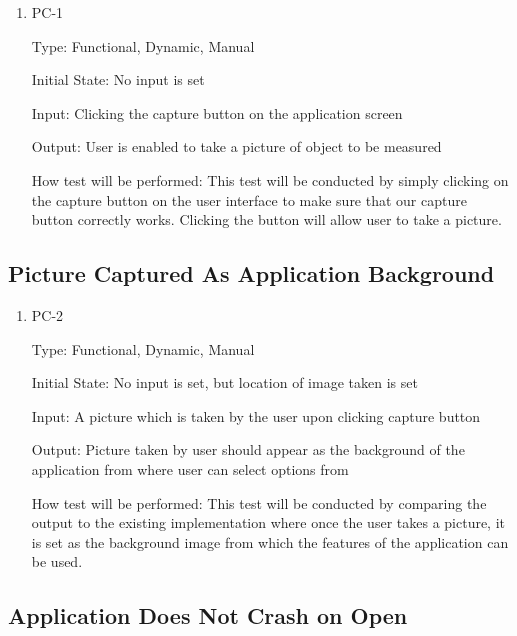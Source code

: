 \documentclass[12pt, titlepage]{article}
\begin{document}
\begin{enumerate}

\item{PC-1\\}

Type: Functional, Dynamic, Manual
					
Initial State: No input is set
					
Input: Clicking the capture button on the application screen
					
Output: User is enabled to take a picture of object to be measured
					
How test will be performed: This test will be conducted by simply clicking on the capture button on the user interface to make sure that our capture button correctly works. Clicking the button will allow user to take a picture. 

\end{enumerate}

\subsection{Picture Captured As Application Background}

\begin{enumerate}

\item{PC-2\\}

Type: Functional, Dynamic, Manual
					
Initial State: No input is set, but location of image taken is set
					
Input: A picture which is taken by the user upon clicking capture button
					
Output: Picture taken by user should appear as the background of the application from where user can select options from
					
How test will be performed: This test will be conducted by comparing the output to the existing implementation where once the user takes a picture, it is set as the background image from which the features of the application can be used.  

\end{enumerate}

\subsection{Application Does Not Crash on Open}
\end{document}
